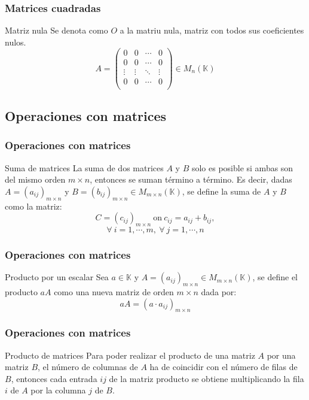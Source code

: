 \documentclass[12pt]{article}
\begin{document}
 \begin{frame}
  \frametitle{Matrices cuadradas}
   \begin{block}{Matriz nula}
Se denota como $O$ a la matriu nula, matriz con todos sus coeficientes nulos.\[ A =  \left(\begin{matrix} %
      0 & 0 & \cdots & 0 \\
      0 & 0 & \cdots & 0 \\
  \vdots & \vdots & \ddots & \vdots \\
   0 & 0 & \cdots & 0 \\
    \end{matrix}\right) \in M_{ n} (\mathbb{K})\]
  \end{block}
 \end{frame}
 
 
 
 
 
 \subsection{Operaciones con matrices}

 \begin{frame}
  \frametitle{Operaciones con matrices}
   \begin{block}{Suma de matrices}
La suma de dos matrices $A$ y $B$ solo es posible si ambas son del mismo orden $m\times n$, entonces se suman t\'ermino a t\'ermino. Es decir, dadas $A=(a_{ij})_{m\times n}$ y $B=(b_{ij})_{m\times n}\in M_{m\times n}(\mathbb{K})$, se define la suma de $A$ y $B$ como la matriz: 
\[C=(c_{ij})_{m\times n}\ \mathrm{on} \ c_{ij} = a_{ij}+b_{ij},\]
\[ \forall \ i=1,\cdots, m, \ \forall\ j=1,\cdots,n\]  
  \end{block}
 \end{frame}


 \begin{frame}
  \frametitle{Operaciones con matrices}
   \begin{block}{Producto por un escalar}
Sea $a \in \mathbb{K}$ y $A = (a_{ij})_{m\times n} \in M_{m\times n}(\mathbb{K})$, se define el producto $aA$ como una nueva matriz de orden $m \times n$ dada por:
\[aA = (a \cdot a_{ij})_{m\times n}\]
  \end{block}
 \end{frame}
 
 
  \begin{frame}
  \frametitle{Operaciones con matrices}
   \begin{block}{Producto de matrices}
Para poder realizar el producto de una matriz $A$ por una matriz $B$, el n\'umero de columnas de $A$ ha de coincidir con el n\'umero de filas de $B$, entonces cada entrada $ij$ de la matriz producto se obtiene multiplicando la fila $i$ de $A$ por la columna $j$ de $B$. 
  \end{block}
 \end{frame}
 
\end{document}
